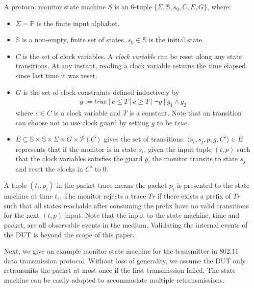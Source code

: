 \begin{definition}
  A protocol monitor state machine $S$ is an 6-tuple $\{\Sigma, \mathbb{S}, s_0, C, E, G\}$, where:
  \begin{itemize}
    \item $\Sigma = \mathbb{P}$ is the finite input alphabet.
    \item $\mathbb{S}$ is a non-empty, finite set of states. $s_0 \in
      \mathbb{S}$ is the initial state.
    \item $C$ is the set of clock variables. A \textit{clock variable} can be
      reset along any state transitions. At any instant, reading a clock
      variable returns the time elapsed since last time it was reset.
    \item $G$ is the set of clock constraints defined inductively by
      \begin{align*}
        g := true\ |\ c \le T\ |\ c \ge T\ |\ \neg g\ |\ g_1 \land g_2
      \end{align*}%
      where $c \in C$ is a clock variable and $T$ is a constant. Note that an
      transition can choose not to use clock guard by setting $g$ to be $true$.
    \item $E \subseteq \mathbb{S} \times \mathbb{S} \times \Sigma \times  G \times \mathscr{P}(C)$
      gives the set of transitions. $\langle s_i, s_j, p, g, C'\rangle \in E$
      represents that if the monitor is in state $s_i$, given the input tuple
      $(t, p)$ such that the clock variables satisfies the guard $g$, the
      monitor transits to state $s_j$ and reset the clocks in $C'$ to 0.
  \end{itemize}
  \label{def:sm}
\end{definition}

A tuple $(t_i, p_i)$ in the packet trace means the packet $p_i$ is presented to
the state machine at time $t_i$.
%
The monitor rejects a trace $Tr$ if there exists a prefix of $Tr$ such that all
states reachable after consuming the prefix have no valid transitions for the
next $(t, p)$ input.
%
Note that the input to the state machine, time and packet, are all
observable events in the medium.
%
Validating the internal events of the DUT is beyond the
scope of this paper.

Next, we give an example monitor state machine for the transmitter in 802.11
data transmission protocol.
%
Without loss of generality, we assume the DUT only
retransmits the packet at most once if the first transmission failed.
%
The state machine can be easily adapted to accommodate multiple retransmissions.

